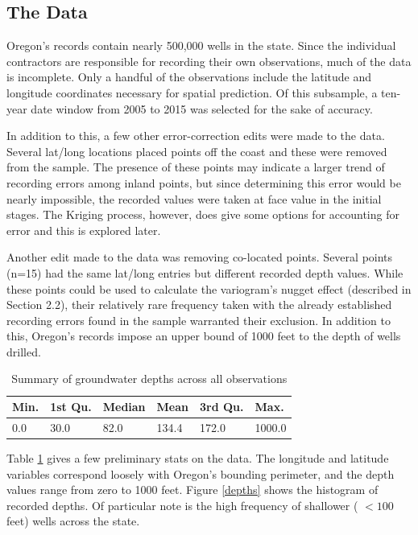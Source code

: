 \documentclass[12pt,twoside]{reedthesis}
\begin{document}
\subsection{The Data}

Oregon's records contain nearly 500,000 wells in the state. Since the individual contractors are responsible for recording their own observations, much of the data is incomplete. Only a handful of the observations include the latitude and longitude coordinates necessary for spatial prediction. Of this subsample, a ten-year date window from 2005 to 2015 was selected for the sake of accuracy. 

In addition to this, a few other error-correction edits were made to the data. Several lat/long locations placed points off the coast and these were removed from the sample. The presence of these points may indicate a larger trend of recording errors among inland points, but since determining this error would be nearly impossible, the recorded values were taken at face value in the initial stages. The Kriging process, however, does give some options for accounting for error and this is explored later. 

Another edit made to the data was removing co-located points. Several points (n=15) had the same lat/long entries but different recorded depth values. While these points could be used to calculate the variogram's nugget effect (described in Section 2.2), their relatively rare frequency taken with the already established recording errors found in the sample warranted their exclusion. In addition to this, Oregon's records impose an upper bound of 1000 feet to the depth of wells drilled.

\begin{table}[h]

	\centering
	

 \begin{tabular}{l|l|l|l|l|l}

\hline
Min. & 1st Qu. & Median & Mean & 3rd Qu. & Max. \\
\hline
0.0  & 30.0  & 82.0  & 134.4  & 172.0  & 1000.0  \\
\hline



\end{tabular}
\label{data}
\caption{Summary of groundwater depths across all observations}

\end{table}

Table \ref{data} gives a few preliminary stats on the data. The longitude and latitude variables correspond loosely with Oregon's bounding perimeter, and the depth values range from zero to 1000 feet. Figure \ref{depths} shows the histogram of recorded depths. Of particular note is the high frequency of shallower ( $<100$ feet) wells across the state. 
\end{document}
